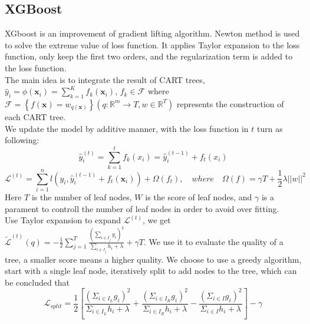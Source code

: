 \documentclass{article}
\begin{document}
\subsection{XGBoost}

XGboost is an improvement of gradient lifting algorithm. Newton method is used to solve the extreme value of loss function. It applies Taylor expansion to the loss function, only keep the first two orders, and the regularization term is added to the loss function.\\
The main idea is to  integrate the result of CART trees, $\hat{y}_{i}=\phi\left(\mathbf{x}_{i}\right)=\sum_{k=1}^{K} f_{k}\left(\mathbf{x}_{i}\right)$, $f_{k} \in \mathcal{F}$ where  $\mathcal{F}=\left\{f(\mathbf{x})=w_{q(\mathbf{x})}\right\}\left(q: \mathbb{R}^{m} \rightarrow T, w \in \mathbb{R}^{T}\right)$ represents the construction of each CART tree. \\
We update the model by additive manner, with the loss function in $t$ turn as following: $$\hat{y}_{i}^{(t)}=\sum_{k=1}^{t} f_{k}\left(x_{i}\right)=\hat{y}_{i}^{(t-1)}+f_{t}\left(x_{i}\right)$$ $$\mathcal{L}^{(t)}=\sum_{i=1}^{n} l\left(y_{i}, \hat{y}_{i}^{(t-1)}+f_{t}\left(\mathbf{x}_{i}\right)\right)+\Omega\left(f_{t}\right), \quad where \quad  \Omega(f) = \gamma T + \frac{1}{2}\lambda \left|\left|w\right|\right| ^2$$ Here $T$ is the number of leaf nodes, $W$ is the score of leaf nodes, and $\gamma$ is a parament to controll the number of leaf nodes in order to  avoid over fitting. \\
Use Taylor expansion to expand $\mathcal{L}^{(t)}$, we get $\tilde{\mathcal{L}}^{(t)}(q)=-\frac{1}{2} \sum_{j=1}^{T} \frac{\left(\sum_{i \in I_{j}} g_{i}\right)^{2}}{\sum_{i \in I_{j}} h_{i}+\lambda}+\gamma T$. We use it to evaluate the quality of a tree, a smaller score means a higher quality. We choose to use a greedy algorithm, start with a single leaf node, iteratively split to add nodes to the tree, which can be concluded that $$\mathcal{L}_{split} = \frac{1}{2} \left[ \frac{\left( \Sigma_{i \in I_{L}} g_i\right) ^2}{\Sigma_{i \in I_{L}} h_i+\lambda} + \frac{\left( \Sigma_{i \in I_{R}} g_i\right) ^2}{\Sigma_{i \in I_{R}} h_i+\lambda} - \frac{\left( \Sigma_{i \in I} g_i\right) ^2}{\Sigma_{i \in I} h_i+\lambda} \right] - \gamma  $$
\end{document}
